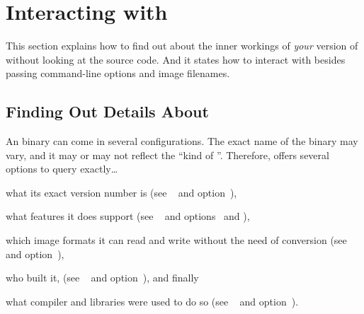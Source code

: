 

\section[Interacting with \App\commonpart]{\label{sec:interaction}%
  Interacting with \App\commonpart}

This section explains how to find out about the inner workings of \emph{your} version of \App{}
without looking at the source code.  And it states how to interact with \App{} besides passing
command-line options and image filenames.


\subsection[Finding Out Details]{\label{sec:finding-out-details}%
  Finding Out Details About \app}

An \appcmd{} binary can come in several configurations.  The exact name of the binary may vary,
and it may or may not reflect the ``kind of \app''.  Therefore, \appcmd{} offers several options
to query exactly\dots

\begin{compactitemize}
\item
  what its exact version number is (see \sectionabbr~ and
  option~),

\item
  what features it does support (see \sectionabbr~ and
  options~ and
  ),

\item
  which image formats it can read and write without the need of conversion (see
  \sectionabbr~ and
  option~),

\item
  who built it, (see \sectionabbr~ and
  option~), and finally

\item
  what compiler and libraries were used to do so (see
  \sectionabbr~ and
  option~).
\end{compactitemize}

